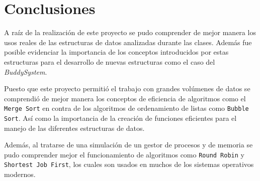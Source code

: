 \section{Conclusiones}

A raíz de la realización de este proyecto se pudo comprender de mejor manera los usos reales de las estructuras de datos analizadas durante las clases. Además fue posible evidenciar la importancia de los conceptos introducidos por estas estructuras para el desarrollo de nuevas estructuras como el caso del \textit{BuddySystem}.

Puesto que este proyecto permitió el trabajo con grandes volúmenes de datos se comprendió de mejor manera los conceptos de eficiencia de algoritmos como el \texttt{Merge Sort} en contra de los algoritmos de ordenamiento de listas como \texttt{Bubble Sort}. Así como la importancia de la creación de funciones eficientes para el manejo de las diferentes estructuras de datos.

Además, al tratarse de una simulación de un gestor de procesos y de memoria se pudo comprender mejor el funcionamiento de algoritmos como \texttt{Round Robin} y \texttt{Shortest Job First}, los cuales son usados en muchos de los sistemas operativos modernos.